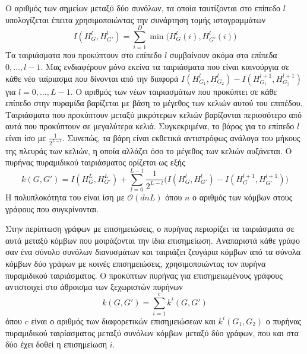 Ο αριθμός των σημείων μεταξύ δύο συνόλων, τα οποία ταυτίζονται στο επίπεδο $l$ υπολογίζεται έπειτα χρησιμοποιώντας την συνάρτηση τομής ιστογραμμάτων
\begin{equation}
  I(H_G^l,H_{G'}^l) = \sum_{i=1}^D \min\big(H_G^l(i),H_{G'}^l(i)\big)
\end{equation}
Τα ταιριάσματα που προκύπτουν στο επίπεδο $l$ συμβαίνουν ακόμα στα επίπεδα $0, \ldots, l-1$.
Μας ενδιαφέρουν μόνο εκείνα τα ταιριάσματα που είναι καινούργια σε κάθε νέο ταίριασμα που δίνονται από την διαφορά $I(H_{G_1}^l,H_{G_2}^l) - I(H_{G_1}^{l+1},H_{G_2}^{l+1})$ για $l=0,\ldots,L-1$.
Ο αριθμός των νέων ταιριασμάτων που προκύπτει σε κάθε επίπεδο στην πυραμίδα βαρίζεται με βάση το μέγεθος των κελιών αυτού του επιπέδου.
Ταιριάσματα που προκύπτουν μεταξύ μικρότερων κελιών βαρίζονται περισσότερο από αυτά που προκύπτουν σε μεγαλύτερα κελιά.
Συγκεκριμένα, το βάρος για το επίπεδο $l$ είναι ίσο με $\frac{1}{2^{L-l}}$.
Συνεπώς, τα βάρη είναι εκθετικά αντιστρόφως ανάλογα του μήκους της πλευράς των κελιών, η οποία αλλάζει όσο το μέγεθος των κελιών αυξάνεται.
Ο πυρήνας πυραμιδικού ταιριάσματος ορίζεται ως εξής
\begin{equation}
  k(G,G') = I(H_G^L,H_{G'}^L) + \sum_{l=0}^{L-1} \frac{1}{2^{L-l}}\big(I(H_G^l,H_{G'}^l) - I(H_G^{l+1},H_{G'}^{l+1})\big)
\end{equation} 
Η πολυπλοκότητα του είναι ίση με $\mathcal{O}(dnL)$ όπου $n$ ο αριθμός των κόμβων στους γράφους που συγκρίνονται.

Στην περίπτωση γράφων με επισημειώσεις, ο πυρήνας περιορίζει τα ταιριάσματα σε αυτά μεταξύ κόμβων που μοιράζονται την ίδια επισημείωση.
Αναπαριστά κάθε γράφο σαν ένα σύνολο συνόλων διανυσμάτων και ταιριάζει ζευγάρια κόμβων από τα σύνολα κόμβων δύο γράφων με κοινές επισημειώσεις, χρησιμοποιώντας τον πυρήνα πυραμιδικού ταιριάσματος.
Ο προκύπτων πυρήνας για επισημειωμένους γράφους αντιστοιχεί στο άθροισμα των ξεχωριστών πυρήνων
\begin{equation}
    k(G, G') = \sum_{i=1}^c k^i(G,G')
\end{equation}
όπου $c$ είναι ο αριθμός των διαφορετικών επισημειώσεων και $k^i(G_1,G_2)$ ο πυρήνας πυραμιδικού ταιρίασματος μεταξύ συνόλων κόμβων μεταξύ δύο γράφων, που και στα δύο έχει δοθεί η επισημείωση $i$.


